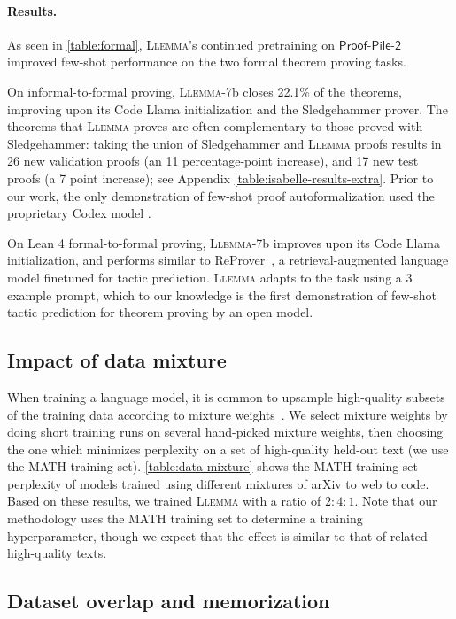 \paragraph{Results.}
As seen in \autoref{table:formal},
\textsc{Llemma}'s continued pretraining on $\mathsf{Proof}$-$\mathsf{Pile}$-$\mathsf{2}$ improved few-shot performance on the two formal theorem proving tasks. 

On informal-to-formal proving, \textsc{Llemma}-7b closes 22.1\% of the theorems, improving upon its Code Llama initialization and the Sledgehammer prover. The theorems that \textsc{Llemma} proves are often complementary to those proved with Sledgehammer: taking the union of Sledgehammer and \textsc{Llemma} proofs results in 26 new validation proofs (an 11 percentage-point increase), and 17 new test proofs (a 7 point increase); see Appendix \autoref{table:isabelle-results-extra}.
Prior to our work, the only demonstration of few-shot proof autoformalization used the proprietary Codex model \citep{jiang2023draft}.

On Lean 4 formal-to-formal proving, \textsc{Llemma}-7b improves upon its Code Llama initialization, and performs similar to ReProver~\citep{yang2023leandojo}, a retrieval-augmented language model finetuned for tactic prediction. 
\textsc{Llemma} adapts to the task using a 3 example prompt, which to our knowledge is the first demonstration of few-shot tactic prediction for theorem proving by an open model. 

\subsection{Impact of data mixture} When training a language model, it is common to upsample high-quality subsets of the training data according to mixture weights~\citep{brown2020gpt3,gao2020pile,xie2023doremi}. We select mixture weights by doing short training runs on several hand-picked mixture weights, then choosing the one which minimizes perplexity on a set of high-quality held-out text (we use the MATH training set).
\autoref{table:data-mixture} shows the MATH training set perplexity of models trained using different mixtures of arXiv to web to code. Based on these results, we trained \textsc{Llemma} with a ratio of $2:4:1$. Note that our methodology uses the MATH training set to determine a training hyperparameter, though we expect that the effect is similar to that of related high-quality texts.

\subsection{Dataset overlap and memorization}

